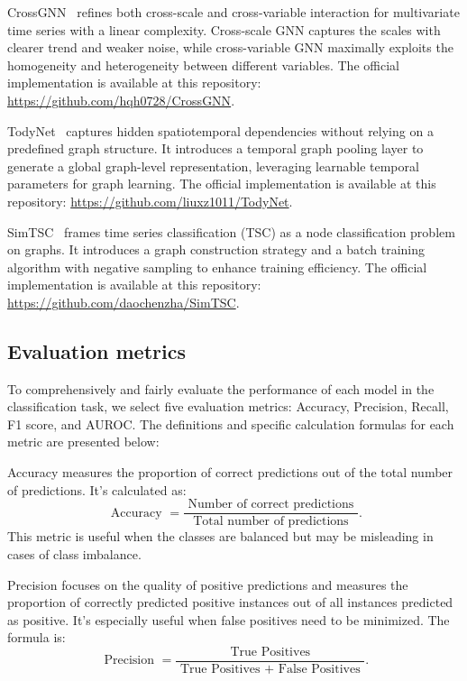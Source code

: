 CrossGNN~\cite{huang2023crossgnn} refines both cross-scale and cross-variable interaction for multivariate time series with a linear complexity. Cross-scale GNN captures the scales with clearer trend and weaker noise, while cross-variable GNN maximally exploits the homogeneity and heterogeneity between different variables. The official implementation is available at this repository: \url{https://github.com/hqh0728/CrossGNN}.

TodyNet~\cite{liu2024todynet} captures hidden spatiotemporal dependencies without relying on a predefined graph structure. It introduces a temporal graph pooling layer to generate a global graph-level representation, leveraging learnable temporal parameters for graph learning. The official implementation is available at this repository: \url{https://github.com/liuxz1011/TodyNet}.

SimTSC~\cite{zha2022towards} frames time series classification (TSC) as a node classification problem on graphs. It introduces a graph construction strategy and a batch training algorithm with negative sampling to enhance training efficiency. The official implementation is available at this repository: \url{https://github.com/daochenzha/SimTSC}.


\subsection{Evaluation metrics}\label{appendix_evaluation_metrics}
To comprehensively and fairly evaluate the performance of each model in the classification task, we select five evaluation metrics: Accuracy, Precision, Recall, F1 score, and AUROC. The definitions and specific calculation formulas for each metric are presented below:

Accuracy measures the proportion of correct predictions out of the total number of predictions. It's calculated as:
\begin{equation}
    \text { Accuracy }=\frac{\text { Number of correct predictions }}{\text { Total number of predictions }}.
\end{equation}
This metric is useful when the classes are balanced but may be misleading in cases of class imbalance.

Precision focuses on the quality of positive predictions and measures the proportion of correctly predicted positive instances out of all instances predicted as positive. It’s especially useful when false positives need to be minimized. The formula is: 
\begin{equation}
    \text { Precision }=\frac{\text { True Positives }}{\text { True Positives }+ \text { False Positives }}.
\end{equation}

